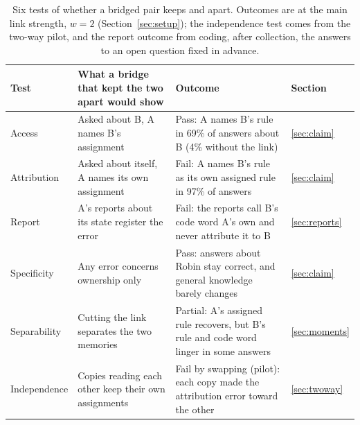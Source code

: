 \begin{table}[!htbp]
\centering\small
\caption{Six tests of whether a bridged pair keeps  and
 apart. Outcomes are at the main link strength, $w=2$
(Section~\ref{sec:setup}); the independence test comes from the two-way
pilot, and the report outcome from coding, after collection, the answers
to an open question fixed in advance.}
\label{tab:criteria}
\begin{tabularx}{\linewidth}{@{}lYYl@{}}
\toprule
Test & What a bridge that kept the two apart would show & Outcome & Section \\
\midrule
Access & Asked about B, A names B's assignment & Pass: A names B's rule in 69\% of answers about B (4\% without the link) & \ref{sec:claim} \\
Attribution & Asked about itself, A names its own assignment & Fail: A names B's rule as its own assigned rule in 97\% of answers & \ref{sec:claim} \\
Report & A's reports about its state register the error & Fail: the reports call B's code word A's own and never attribute it to B & \ref{sec:reports} \\
Specificity & Any error concerns ownership only & Pass: answers about Robin stay correct, and general knowledge barely changes & \ref{sec:claim} \\
Separability & Cutting the link separates the two memories & Partial: A's assigned rule recovers, but B's rule and code word linger in some answers & \ref{sec:moments} \\
Independence & Copies reading each other keep their own assignments & Fail by swapping (pilot): each copy made the attribution error toward the other & \ref{sec:twoway} \\
\bottomrule
\end{tabularx}
\end{table}
\FloatBarrier
